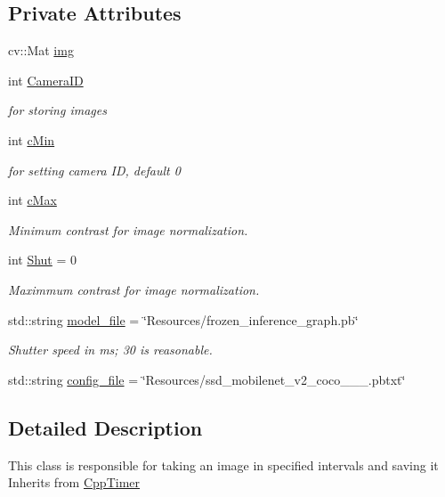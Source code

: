 \subsection*{Private Attributes}
\begin{DoxyCompactItemize}
\item 
cv\+::\+Mat \hyperlink{classCamera_a9a184f1522b055612f5ede1cc2443457}{img}
\item 
int \hyperlink{classCamera_a96c19741cb6ba7a897ca90746e8b8918}{Camera\+ID}
\begin{DoxyCompactList}\small\item\em for storing images \end{DoxyCompactList}\item 
int \hyperlink{classCamera_ab6f982f42917eb9ef75606e97fc82911}{c\+Min}
\begin{DoxyCompactList}\small\item\em for setting camera ID, default 0 \end{DoxyCompactList}\item 
int \hyperlink{classCamera_ad784af65b7f7e1b6ebb9b33df774d7db}{c\+Max}
\begin{DoxyCompactList}\small\item\em Minimum contrast for image normalization. \end{DoxyCompactList}\item 
int \hyperlink{classCamera_ad3d6176cdcccecd116f2e7867b642ad1}{Shut} = 0
\begin{DoxyCompactList}\small\item\em Maximmum contrast for image normalization. \end{DoxyCompactList}\item 
std\+::string \hyperlink{classCamera_a22a0754fc359b253e203ce59026021a0}{model\+\_\+file} = \char`\"{}Resources/frozen\+\_\+inference\+\_\+graph.\+pb\char`\"{}
\begin{DoxyCompactList}\small\item\em Shutter speed in ms; 30 is reasonable. \end{DoxyCompactList}\item 
std\+::string \hyperlink{classCamera_affbb5356cbe1e069d4e107ccda0d1b2b}{config\+\_\+file} = \char`\"{}Resources/ssd\+\_\+mobilenet\+\_\+v2\+\_\+coco\+\_\+\_\+\_.\+pbtxt\char`\"{}
\end{DoxyCompactItemize}


\subsection{Detailed Description}
This class is responsible for taking an image in specified intervals and saving it Inherits from \hyperlink{classCppTimer}{Cpp\+Timer} 


